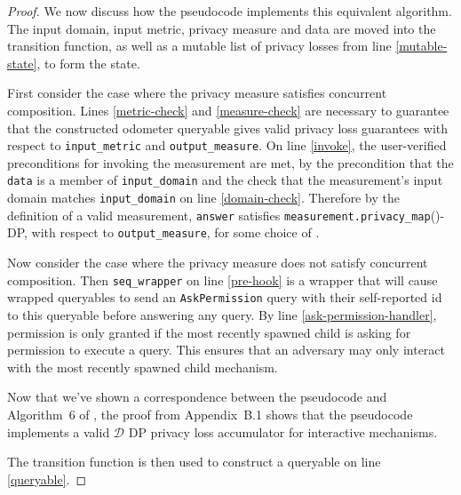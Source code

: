 \documentclass{article}
\begin{document}
\begin{proof}
    We now discuss how the pseudocode implements this equivalent algorithm.
    The input domain, input metric, privacy measure and data are moved into the transition function,
    as well as a mutable list of privacy losses from line \ref{mutable-state},
    to form the state.

    First consider the case where the privacy measure satisfies concurrent composition.
    Lines \ref{metric-check} and \ref{measure-check} are necessary to guarantee that the constructed odometer queryable 
    gives valid privacy loss guarantees with respect to \texttt{input\_metric} and \texttt{output\_measure}.
    On line \ref{invoke}, the user-verified preconditions for invoking the measurement are met,
    by the precondition that the \texttt{data} is a member of \texttt{input\_domain}
    and the check that the measurement's input domain matches \texttt{input\_domain} on line \ref{domain-check}.
    Therefore by the definition of a valid measurement,
    \texttt{answer} satisfies \texttt{measurement.privacy\_map}(\din)-DP, with respect to \texttt{output\_measure}, 
    for some choice of \din.

    Now consider the case where the privacy measure does not satisfy concurrent composition.
    Then \texttt{seq\_wrapper} on line \ref{pre-hook} is a wrapper that will cause wrapped queryables 
    to send an \texttt{AskPermission} query with their self-reported id to this queryable before answering any query.
    By line \ref{ask-permission-handler}, permission is only granted 
    if the most recently spawned child is asking for permission to execute a query.
    This ensures that an adversary may only interact with the most recently spawned child mechanism.
    
    
    Now that we've shown a correspondence between the pseudocode and Algorithm~6 of \cite{haney2023concurrentcompositioninteractivedifferential},
    the proof from Appendix~B.1 shows that the pseudocode implements a valid $\mathcal{D}$ DP privacy loss accumulator for interactive mechanisms.

    The transition function is then used to construct a queryable on line \ref{queryable}.
\end{proof}



\end{document}
